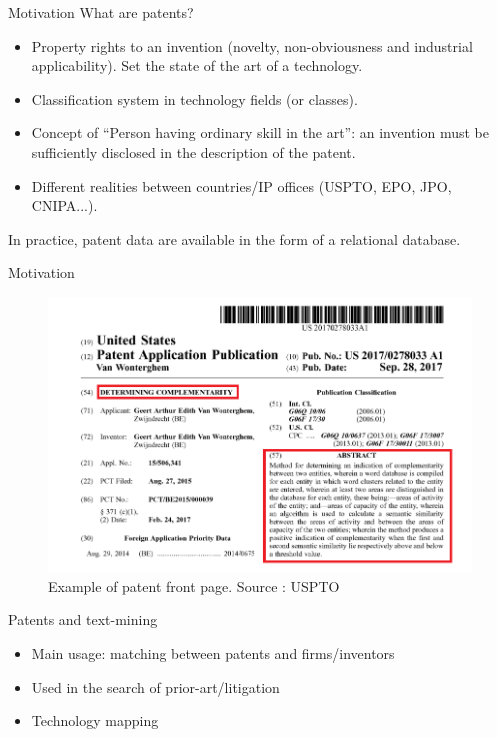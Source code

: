 \documentclass{beamer}
\begin{document}
\begin{frame}{Motivation}
What are patents?
\begin{itemize}
    \item Property rights to an invention (novelty, non-obviousness and industrial applicability). Set the state of the art of a technology.
    \item Classification system in technology fields (or classes).
    \item Concept of ``Person having ordinary skill in the art'': an invention must be sufficiently disclosed in the description of the patent.
    \item Different realities between countries/IP offices (USPTO, EPO, JPO, CNIPA...).
\end{itemize}

In practice, patent data are available in the form of a relational database.
\end{frame}
\begin{frame}{Motivation}
    \begin{figure}
        \centering
        \includegraphics[width=0.8\linewidth]{figures/patent_abstract_ex.png}
        \caption{Example of patent front page. Source : USPTO}
    \end{figure}
\end{frame}
\begin{frame}{Patents and text-mining}
    \begin{itemize}
        \item Main usage: matching between patents and firms/inventors
        \item Used in the search of prior-art/litigation
        \item Technology mapping
    \end{itemize}
\end{frame}
\end{document}
